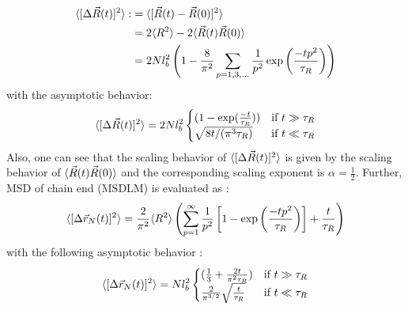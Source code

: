 \documentclass[
    paper=A4,pagesize=automedia,fontsize=12pt,
    BCOR=15mm,DIV=22,
    twoside,headinclude,footinclude=false,
    fleqn,             %
    bibliography=totocnumbered,          %
    listof=totoc,                %
    listof=flat,                 %
    cleardoublepage=empty      %
    numbers=endperiod
]{scrartcl}
\begin{document}
\begin{equation} \label{eq:rouse_msd_ete}
    \begin{aligned}
        \langle[\Delta \vec{R}(t)]^2\rangle :&= \langle[\vec{R}(t)-\vec{R}(0)]^2\rangle \\
        & = 2\langle R^2\rangle - 2 \langle\vec{R}(t)\vec{R}(0)\rangle \\
        & = 2 N l_b^2 \left(1 - \frac{8}{\pi^2}\sum_{p=1,3,\ldots}\frac{1}{p^2} \exp\left(\frac{-tp^2}{\tau_R}\right)\right)
    \end{aligned}
\end{equation}
with the asymptotic behavior:
\begin{equation}
    \langle[\Delta \vec{R}(t)]^2\rangle = 2Nl_b^2 \begin{cases}
        (1-\exp(\frac{-t}{\tau_R})) & \text{if } t \gg \tau_R \\
        \sqrt{8t/(\pi^3\tau_R)} & \text{if } t \ll \tau_R
    \end{cases}
\end{equation}
Also, one can see that the scaling behavior of $\langle[\Delta \vec{R}(t)]^2\rangle$ is given
by the scaling behavior of $\langle\vec{R}(t)\vec{R}(0)\rangle$ and the corresponding
scaling exponent is $\alpha = \frac{1}{2}$. Further, 
MSD of chain end (MSDLM) is evaluated as \cite{svaneborg_2020}:
\begin{equation}
    \langle[\Delta \vec{r}_N(t)]^2\rangle = \frac{2}{\pi^2} \langle R^2\rangle \left( \sum_{p=1}^{\infty} \frac{1}{p^2} \left[ 1-\exp\left(\frac{-t p^2}{\tau_R}\right) \right] + \frac{t}{\tau_R} \right)
\end{equation}
with the following asymptotic behavior \cite{svaneborg_2020}:
\begin{equation}
    \langle[\Delta \vec{r}_N(t)]^2\rangle = N l_b^2 \begin{cases}
        (\frac{1}{3} + \frac{2t}{\pi^2 \tau_R}) & \text{if } t \gg \tau_R \\
        \frac{2}{\pi^{3/2}} \sqrt{\frac{t}{\tau_R}} & \text{if } t \ll \tau_R
    \end{cases}
\end{equation}
\end{document}
